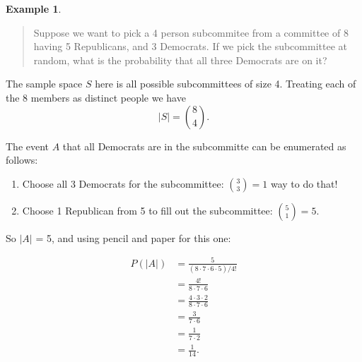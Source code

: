 \documentclass[
]{book}
\providecommand{\tightlist}{%
  \setlength{\itemsep}{0pt}\setlength{\parskip}{0pt}}
\theoremstyle{definition}
\theoremstyle{definition}
\newtheorem{example}{Example}[chapter]
\theoremstyle{definition}
\theoremstyle{definition}
\theoremstyle{remark}
\begin{document}
\begin{example}
\protect\hypertarget{exm:R-D-subcommittees}{}\label{exm:R-D-subcommittees}\leavevmode

\begin{quote}
Suppose we want to pick a 4 person subcommitee from a committee of 8 having 5 Republicans, and 3 Democrats. If we pick the subcommittee at random, what is the probability that all three Democrats are on it?
\end{quote}

The sample space \(S\) here is all possible subcommittees of size 4. Treating each of the 8 members as distinct people we have \[|S| = \binom{8}{4}.\]

The event \(A\) that all Democrats are in the subcommitte can be enumerated as follows:

\begin{enumerate}
\def\labelenumi{\arabic{enumi}.}
\tightlist
\item
  Choose all 3 Democrats for the subcommittee: \(\binom{3}{3} = 1\) way to do that!
\item
  Choose 1 Republican from 5 to fill out the subcommittee: \(\binom{5}{1} = 5.\)
\end{enumerate}

So \(|A|\) = 5, and using pencil and paper for this one:

\begin{align*}
P(|A|) &= \frac{5}{(8\cdot 7 \cdot 6 \cdot 5)/4!} \\
       &= \frac{4!}{8 \cdot 7 \cdot 6}\\
       &= \frac{4 \cdot 3 \cdot 2}{8 \cdot 7 \cdot 6}\\
       &= \frac{3}{7 \cdot 6}\\
       &= \frac{1}{7 \cdot 2}\\
       &=\frac{1}{14}.
\end{align*}

\end{example}
\end{document}
